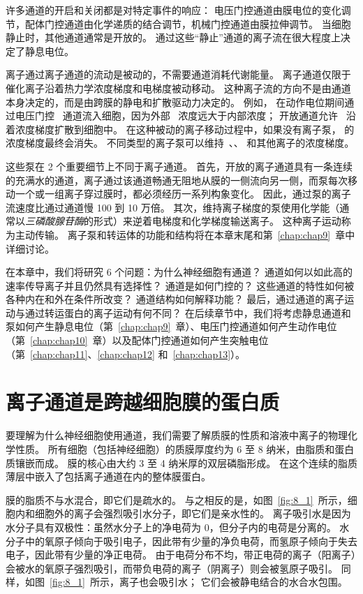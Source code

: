 许多通道的开启和关闭都是对特定事件的响应：
电压门控通道由膜电位的变化调节，配体门控通道由化学递质的结合调节，机械门控通道由膜拉伸调节。
当细胞静止时，其他通道通常是开放的。
通过这些“静止”通道的离子流在很大程度上决定了静息电位。


离子通过离子通道的流动是被动的，不需要通道消耗代谢能量。
离子通道仅限于催化离子沿着热力学浓度梯度和电梯度被动移动。
这种离子流的方向不是由通道本身决定的，而是由跨膜的静电和扩散驱动力决定的。
例如， 在动作电位期间通过电压门控~ 通道流入细胞，因为外部~ 浓度远大于内部浓度；
开放通道允许~ 沿着浓度梯度扩散到细胞中。
在这种被动的离子移动过程中，如果没有离子泵， 的浓度梯度最终会消失。
不同类型的离子泵可以维持~、、 和其他离子的浓度梯度。


这些泵在 2 个重要细节上不同于离子通道。
首先，开放的离子通道具有一条连续的充满水的通道，离子通过该通道畅通无阻地从膜的一侧流向另一侧，而泵每次移动一个或一组离子穿过膜时，都必须经历一系列构象变化。
因此，通过泵的离子流速度比通过通道慢 100 到 10 万倍。
其次，维持离子梯度的泵使用化学能（通常以\textit{三磷酸腺苷酶}的形式）来逆着电梯度和化学梯度输送离子。
这种离子运动称为主动传输。
离子泵和转运体的功能和结构将在本章末尾和第~\ref{chap:chap9}~章中详细讨论。


在本章中，我们将研究 6 个问题：为什么神经细胞有通道？
通道如何以如此高的速率传导离子并且仍然具有选择性？ 
通道是如何门控的？
这些通道的特性如何被各种内在和外在条件所改变？
通道结构如何解释功能？
最后，通过通道的离子运动与通过转运蛋白的离子运动有何不同？
在后续章节中，我们将考虑静息通道和泵如何产生静息电位（第~\ref{chap:chap9}~章）、电压门控通道如何产生动作电位（第~\ref{chap:chap10}~章）以及配体门控通道如何产生突触电位（第~\ref{chap:chap11}、\ref{chap:chap12} 和~\ref{chap:chap13}）。



\section{离子通道是跨越细胞膜的蛋白质}

要理解为什么神经细胞使用通道，我们需要了解质膜的性质和溶液中离子的物理化学性质。
所有细胞（包括神经细胞）的质膜厚度约为 6 至 8 纳米，由脂质和蛋白质镶嵌而成。
膜的核心由大约 3 至 4 纳米厚的双层磷脂形成。
在这个连续的脂质薄层中嵌入了包括离子通道在内的整体膜蛋白。


膜的脂质不与水混合，即它们是疏水的。
与之相反的是，如图~\ref{fig:8_1}~所示，细胞内和细胞外的离子会强烈吸引水分子，即它们是亲水性的。
离子吸引水是因为水分子具有双极性：虽然水分子上的净电荷为 0，但分子内的电荷是分离的。
水分子中的氧原子倾向于吸引电子，因此带有少量的净负电荷，而氢原子倾向于失去电子，因此带有少量的净正电荷。
由于电荷分布不均，带正电荷的离子（阳离子）会被水的氧原子强烈吸引，而带负电荷的离子（阴离子）则会被氢原子吸引。
同样，如图~\ref{fig:8_1}~所示，离子也会吸引水；
它们会被静电结合的水合水包围。


